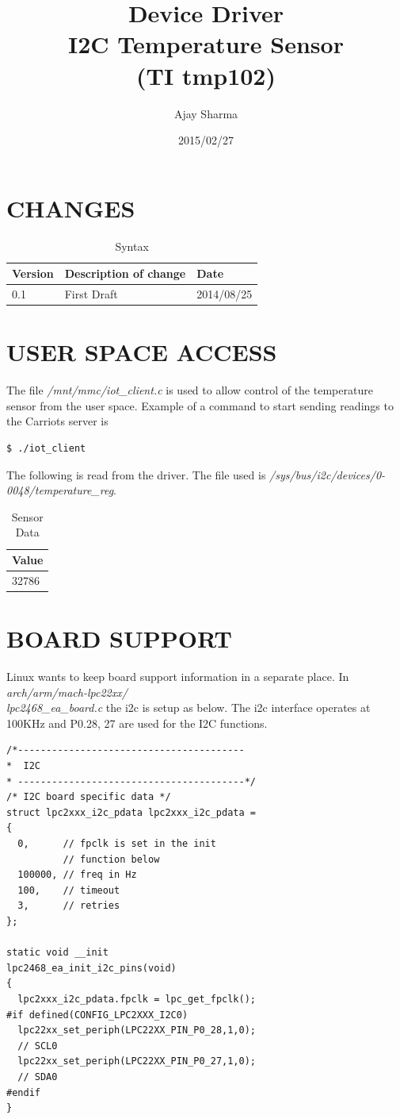 \documentclass{article}
\title{Device Driver \\I2C Temperature Sensor \\(TI tmp102)}
\author{Ajay Sharma}
\date{2015/02/27}
\begin{document}
\maketitle

\section{CHANGES}
\begin{table}[H]
\centering
 \begin{tabular}{|l|l|l|}
 \hline Version & Description of change & Date \\ 
 \hline 0.1 & First Draft & 2014/08/25\\ 
 \hline
 \end{tabular} 
\caption{Syntax}
\end{table}

\section{USER SPACE ACCESS}
The file \emph{/mnt/mmc/iot\_client.c} is used to allow control of the temperature sensor from the user space. Example of a command to start sending readings to the Carriots server is 
\begin{verbatim}
$ ./iot_client 
\end{verbatim}
The following is read from the driver. The file used is \emph{/sys/bus/i2c/devices/0-0048/temperature\_reg}.
\begin{table}[H]
\centering
 \begin{tabular}{|l|}
 \hline Value \\ 
 \hline 32786 \\
 \hline
 \end{tabular} 
\caption{Sensor Data}
\end{table}

\section{BOARD SUPPORT}
Linux wants to keep board support information in a separate place. In 
\emph{arch/arm/mach-lpc22xx/\\lpc2468\_ea\_board.c} the i2c is setup as below.
The i2c interface operates at 100KHz and P0.28, 27 are used for the I2C functions.
\begin{verbatim}
/*----------------------------------------
*  I2C  
* ----------------------------------------*/
/* I2C board specific data */
struct lpc2xxx_i2c_pdata lpc2xxx_i2c_pdata = 
{ 	
  0,      // fpclk is set in the init 
          // function below
  100000, // freq in Hz 	
  100,    // timeout 
  3,      // retries 
};

static void __init 
lpc2468_ea_init_i2c_pins(void)
{ 	
  lpc2xxx_i2c_pdata.fpclk = lpc_get_fpclk();
#if defined(CONFIG_LPC2XXX_I2C0)
  lpc22xx_set_periph(LPC22XX_PIN_P0_28,1,0);
  // SCL0
  lpc22xx_set_periph(LPC22XX_PIN_P0_27,1,0);
  // SDA0
#endif 
}
\end{verbatim}
\end{document}
